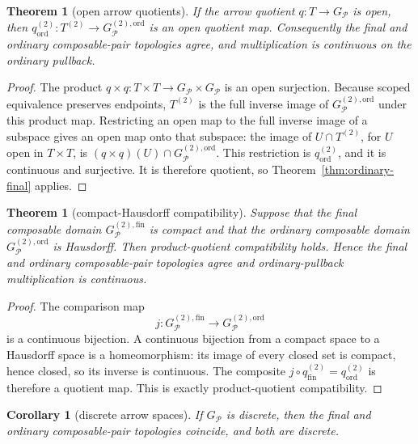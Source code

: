 \documentclass[10pt,reqno]{amsart}
\theoremstyle{definition}
\theoremstyle{plain}
\newtheorem{theorem}[definition]{Theorem}
\newtheorem{corollary}[definition]{Corollary}
\theoremstyle{remark}
\newcommand{\Fin}{\mathrm{fin}}
\newcommand{\Ord}{\mathrm{ord}}
\begin{document}
\begin{theorem}[open arrow quotients]
\label{thm:open-arrow-quotient}
If the arrow quotient $q:T\to G_{\mathcal P}$ is open, then
$q_{\Ord}^{(2)}:T^{(2)}\to G_{\mathcal P}^{(2),\Ord}$ is an open quotient
map.  Consequently the final and ordinary composable-pair topologies agree,
and multiplication is continuous on the ordinary pullback.
\end{theorem}

\begin{proof}
The product $q\times q:T\times T\to G_{\mathcal P}\times G_{\mathcal P}$
is an open surjection.  Because scoped equivalence preserves endpoints,
$T^{(2)}$ is the full inverse image of
$G_{\mathcal P}^{(2),\Ord}$ under this product map.  Restricting an open map
to the full inverse image of a subspace gives an open map onto that subspace:
the image of $U\cap T^{(2)}$, for $U$ open in $T\times T$, is
$(q\times q)(U)\cap G_{\mathcal P}^{(2),\Ord}$.  This restriction is
$q_{\Ord}^{(2)}$, and it is continuous and surjective.  It is therefore
quotient, so Theorem~\ref{thm:ordinary-final} applies.
\end{proof}

\begin{theorem}[compact-Hausdorff compatibility]
Suppose that the final composable domain
$G_{\mathcal P}^{(2),\Fin}$ is compact and that the ordinary composable domain
$G_{\mathcal P}^{(2),\Ord}$ is Hausdorff.  Then product-quotient compatibility
holds.  Hence the final and ordinary composable-pair topologies agree and
ordinary-pullback multiplication is continuous.
\end{theorem}

\begin{proof}
The comparison map
\[
  j:G_{\mathcal P}^{(2),\Fin}\longrightarrow
  G_{\mathcal P}^{(2),\Ord}
\]
is a continuous bijection.  A continuous bijection
from a compact space to a Hausdorff space is a homeomorphism: its image of
every closed set is compact, hence closed, so its inverse is continuous.  The
composite $j\circ q_{\Fin}^{(2)}=q_{\Ord}^{(2)}$ is therefore a quotient map.
This is exactly product-quotient compatibility.
\end{proof}

\begin{corollary}[discrete arrow spaces]
\label{cor:discrete}
If $G_{\mathcal P}$ is discrete, then the final and ordinary composable-pair
topologies coincide, and both are discrete.
\end{corollary}
\end{document}
